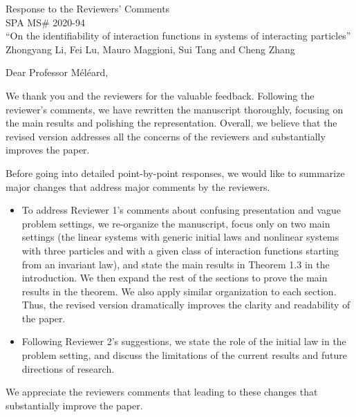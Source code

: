 \documentclass[12pt]{article}
\newcommand{\FL}[1]{\textcolor{blue}{{#1}}}
\begin{document}
\begin{center}
{\Large Response to the Reviewers' Comments}\\
\vspace{4mm}
SPA MS\# 2020-94 \\
``On the identifiability of interaction functions  in systems of interacting particles'' \\
 \vspace{2mm}
  Zhongyang Li, Fei Lu, Mauro Maggioni, Sui Tang and Cheng Zhang
  \end{center}


\noindent Dear Professor M\'el\'eard,

 \vspace{2mm}
 
We thank you and the reviewers for the valuable feedback. Following the reviewer's comments, we have rewritten the manuscript thoroughly, focusing on the main results and polishing the representation. Overall, we believe that the revised version addresses all the concerns of the reviewers and substantially improves the paper.

Before going into detailed point-by-point responses, we would like to summarize major changes that address major comments by the reviewers. 
\begin{itemize}
\item To address Reviewer 1's comments about confusing presentation and vague problem settings, we re-organize the manuscript, focus only on two main settings (the linear systems with generic initial laws and nonlinear systems with three particles and with a given class of interaction functions starting from an invariant law), and state the main results in Theorem 1.3 in the introduction. We then expand the rest of the sections to prove the main results in the theorem. We also apply similar organization to each section. Thus, the revised version dramatically improves the clarity and readability of the paper.   
\item Following Reviewer 2's suggestions, we state the role of the initial law in the problem setting, and discuss the limitations of the current results and future directions of research.   \vspace{-2mm}
\end{itemize}
We appreciate the reviewers comments that leading to these changes that substantially improve the paper. 
\vskip0.2cm
\end{document}
